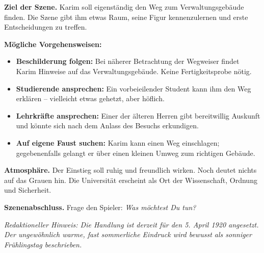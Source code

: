 \begin{meisterinfo}
\textbf{Ziel der Szene.} Karim soll eigenständig den Weg zum Verwaltungsgebäude finden. Die Szene gibt ihm etwas Raum, seine Figur kennenzulernen und erste Entscheidungen zu treffen.

\medskip\noindent\textbf{Mögliche Vorgehensweisen:}
\begin{itemize}
\item \textbf{Beschilderung folgen:} Bei näherer Betrachtung der Wegweiser findet Karim Hinweise auf das Verwaltungsgebäude. Keine Fertigkeitsprobe nötig.
\item \textbf{Studierende ansprechen:} Ein vorbeieilender Student kann ihm den Weg erklären -- vielleicht etwas gehetzt, aber höflich.
\item \textbf{Lehrkräfte ansprechen:} Einer der älteren Herren gibt bereitwillig Auskunft und könnte sich nach dem Anlass des Besuchs erkundigen.
\item \textbf{Auf eigene Faust suchen:} Karim kann einen Weg einschlagen; gegebenenfalls gelangt er über einen kleinen Umweg zum richtigen Gebäude.
\end{itemize}

\textbf{Atmosphäre.} Der Einstieg soll ruhig und freundlich wirken. Noch deutet nichts auf das Grauen hin. Die Universität erscheint als Ort der Wissenschaft, Ordnung und Sicherheit.

\textbf{Szenenabschluss.} Frage den Spieler: \emph{\glqq{}Was möchtest Du tun?\grqq{}} 
\end{meisterinfo}

\noindent\textit{Redaktioneller Hinweis: Die Handlung ist derzeit für den 5. April 1920 angesetzt. Der ungewöhnlich warme, fast sommerliche Eindruck wird bewusst als sonniger Frühlingstag beschrieben.}
